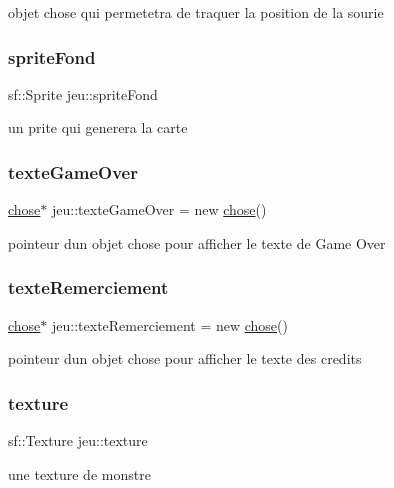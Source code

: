 objet chose qui permetetra de traquer la position de la sourie \mbox{\label{classjeu_a9c949f4b3a6e66d3b311ebdc22f1688c}} 
\subsubsection{\texorpdfstring{sprite\+Fond}{spriteFond}}
{\footnotesize\ttfamily sf\+::\+Sprite jeu\+::sprite\+Fond}

un prite qui generera la carte \mbox{\label{classjeu_a2fdd2cefbf2b699bb0fb47ccea1cae69}} 
\subsubsection{\texorpdfstring{texte\+Game\+Over}{texteGameOver}}
{\footnotesize\ttfamily \mbox{\hyperlink{classchose}{chose}}$\ast$ jeu\+::texte\+Game\+Over = new \mbox{\hyperlink{classchose}{chose}}()}

pointeur d\textquotesingle{}un objet chose pour afficher le texte de Game Over \mbox{\label{classjeu_a506ea767918d5ac9622a4cadf1b8eaea}} 
\subsubsection{\texorpdfstring{texte\+Remerciement}{texteRemerciement}}
{\footnotesize\ttfamily \mbox{\hyperlink{classchose}{chose}}$\ast$ jeu\+::texte\+Remerciement = new \mbox{\hyperlink{classchose}{chose}}()}

pointeur d\textquotesingle{}un objet chose pour afficher le texte des credits \mbox{\label{classjeu_ad8d2f3b66c694c4ea003bb5bc6904e1a}} 
\subsubsection{\texorpdfstring{texture}{texture}}
{\footnotesize\ttfamily sf\+::\+Texture jeu\+::texture}

une texture de monstre \mbox{\label{classjeu_addb3c0ca950f7d707b53d24b4fbfa03e}} 
